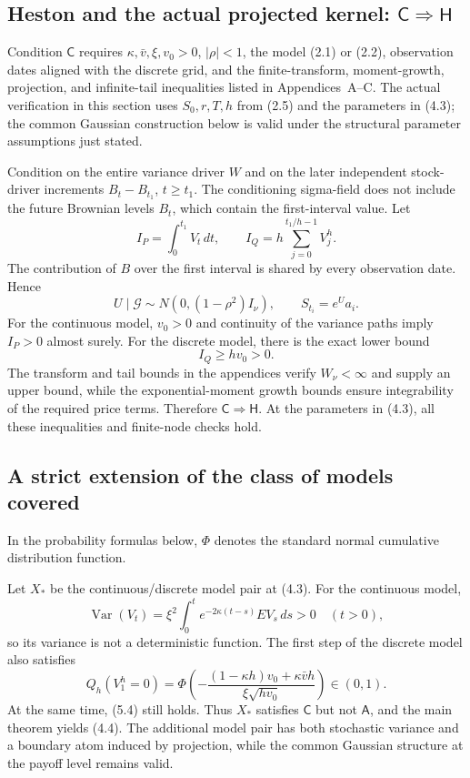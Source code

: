 \documentclass[11pt,a4paper]{article}
\begin{document}
\subsection{Heston and the actual projected kernel: \(\mathsf C\Rightarrow\mathsf H\)}

Condition \(\mathsf C\) requires \(\kappa,\bar v,\xi,v_0>0\), \(|\rho|<1\), the model (2.1) or (2.2), observation dates aligned with the discrete grid, and the finite-transform, moment-growth, projection, and infinite-tail inequalities listed in Appendices~A--C. The actual verification in this section uses \(S_0,r,T,h\) from (2.5) and the parameters in (4.3); the common Gaussian construction below is valid under the structural parameter assumptions just stated.

Condition on the entire variance driver \(W\) and on the later independent stock-driver increments \(B_t-B_{t_1}\), \(t\ge t_1\). The conditioning sigma-field does not include the future Brownian levels \(B_t\), which contain the first-interval value. Let
\[
I_P=\int_0^{t_1}V_t\,dt,\qquad
I_Q=h\sum_{j=0}^{t_1/h-1}V_j^h.
\]
The contribution of \(B\) over the first interval is shared by every observation date. Hence
\[
U\mid\mathcal G\sim N(0,(1-\rho^2)I_\nu),\qquad S_{t_i}=e^Ua_i.
\tag{5.3}
\]
For the continuous model, \(v_0>0\) and continuity of the variance paths imply \(I_P>0\) almost surely. For the discrete model, there is the exact lower bound
\[
I_Q\ge hv_0>0.
\tag{5.4}
\]
The transform and tail bounds in the appendices verify \(W_\nu<\infty\) and supply an upper bound, while the exponential-moment growth bounds ensure integrability of the required price terms. Therefore \(\mathsf C\Rightarrow\mathsf H\). At the parameters in (4.3), all these inequalities and finite-node checks hold.

\subsection{A strict extension of the class of models covered}

In the probability formulas below, \(\Phi\) denotes the standard normal cumulative distribution function.

Let \(X_*\) be the continuous/discrete model pair at (4.3). For the continuous model,
\[
\operatorname{Var}(V_t)=\xi^2\int_0^t e^{-2\kappa(t-s)}EV_s\,ds>0
\quad(t>0),
\tag{5.5}
\]
so its variance is not a deterministic function. The first step of the discrete model also satisfies
\[
Q_h(V_1^h=0)=
\Phi\!\left(
-\frac{(1-\kappa h)v_0+\kappa\bar v h}{\xi\sqrt{hv_0}}
\right)\in(0,1).
\tag{5.6}
\]
At the same time, (5.4) still holds. Thus \(X_*\) satisfies \(\mathsf C\) but not \(\mathsf A\), and the main theorem yields (4.4). The additional model pair has both stochastic variance and a boundary atom induced by projection, while the common Gaussian structure at the payoff level remains valid.
\end{document}
